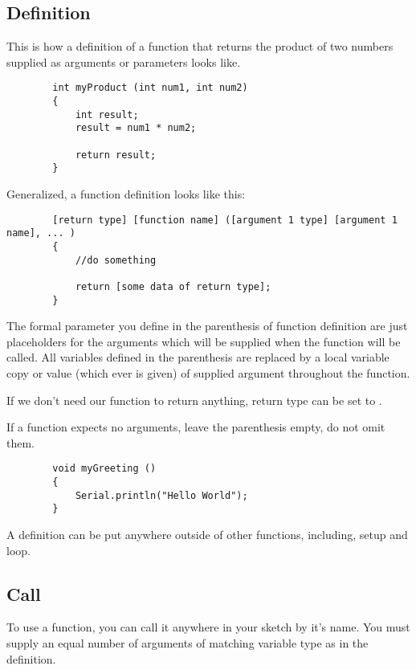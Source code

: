 \documentclass{article}
\begin{document}
	\subsection{Definition}

		This is how a definition of a function that returns the product of two numbers supplied as arguments or parameters looks like.

		\begin{lstlisting}
		int myProduct (int num1, int num2)
		{
			int result;
			result = num1 * num2;

			return result;
		}
		\end{lstlisting}

		Generalized, a function definition looks like this:

		\begin{lstlisting}
		[return type] [function name] ([argument 1 type] [argument 1 name], ... )
		{
			//do something
			
			return [some data of return type];
		}
		\end{lstlisting}

		The formal parameter you define in the parenthesis of function definition are just placeholders for the arguments which will be supplied when the function will be called. All variables defined in the parenthesis are replaced by a local variable copy or value (which ever is given) of supplied argument throughout the function.

		If we don't need our function to return anything, return type can be set to .

		If a function expects no arguments, leave the parenthesis empty, do not omit them.
		
		\begin{lstlisting}
		void myGreeting ()
		{
			Serial.println("Hello World");
		}
		\end{lstlisting}

		A definition can be put anywhere outside of other functions, including, setup and loop.

	\subsection{Call}

		To use a function, you can call it anywhere in your sketch by it's name. You must supply an equal number of arguments of matching variable type as in the definition.
\end{document}
